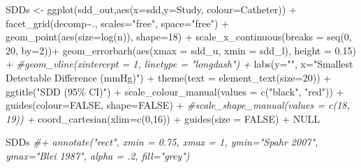 \documentclass[
]{article}
\newenvironment{Shaded}{\begin{snugshade}}{\end{snugshade}}
\newcommand{\AttributeTok}[1]{\textcolor[rgb]{0.77,0.63,0.00}{#1}}
\newcommand{\CommentTok}[1]{\textcolor[rgb]{0.56,0.35,0.01}{\textit{#1}}}
\newcommand{\ConstantTok}[1]{\textcolor[rgb]{0.00,0.00,0.00}{#1}}
\newcommand{\DecValTok}[1]{\textcolor[rgb]{0.00,0.00,0.81}{#1}}
\newcommand{\FloatTok}[1]{\textcolor[rgb]{0.00,0.00,0.81}{#1}}
\newcommand{\FunctionTok}[1]{\textcolor[rgb]{0.00,0.00,0.00}{#1}}
\newcommand{\NormalTok}[1]{#1}
\newcommand{\OtherTok}[1]{\textcolor[rgb]{0.56,0.35,0.01}{#1}}
\newcommand{\SpecialCharTok}[1]{\textcolor[rgb]{0.00,0.00,0.00}{#1}}
\newcommand{\StringTok}[1]{\textcolor[rgb]{0.31,0.60,0.02}{#1}}
\begin{document}
\begin{Shaded}
\begin{Highlighting}[]
\NormalTok{SDDs }\OtherTok{\textless{}{-}} \FunctionTok{ggplot}\NormalTok{(sdd\_out,}\FunctionTok{aes}\NormalTok{(}\AttributeTok{x=}\NormalTok{sdd,}\AttributeTok{y=}\NormalTok{Study, }
                           \AttributeTok{colour=}\NormalTok{Catheter)) }\SpecialCharTok{+}
  \FunctionTok{facet\_grid}\NormalTok{(decomp}\SpecialCharTok{\textasciitilde{}}\NormalTok{., }\AttributeTok{scales=}\StringTok{"free"}\NormalTok{, }\AttributeTok{space=}\StringTok{"free"}\NormalTok{) }\SpecialCharTok{+}
  \FunctionTok{geom\_point}\NormalTok{(}\FunctionTok{aes}\NormalTok{(}\AttributeTok{size=}\FunctionTok{log}\NormalTok{(n)), }\AttributeTok{shape=}\DecValTok{18}\NormalTok{) }\SpecialCharTok{+} 
  \FunctionTok{scale\_x\_continuous}\NormalTok{(}\AttributeTok{breaks =} \FunctionTok{seq}\NormalTok{(}\DecValTok{0}\NormalTok{, }\DecValTok{20}\NormalTok{, }\AttributeTok{by=}\DecValTok{2}\NormalTok{))}\SpecialCharTok{+}
  \FunctionTok{geom\_errorbarh}\NormalTok{(}\FunctionTok{aes}\NormalTok{(}\AttributeTok{xmax =}\NormalTok{ sdd\_u, }\AttributeTok{xmin =}\NormalTok{ sdd\_l), }\AttributeTok{height =} \FloatTok{0.15}\NormalTok{) }\SpecialCharTok{+}
  \CommentTok{\#geom\_vline(xintercept = 1, linetype = "longdash") +}
  \FunctionTok{labs}\NormalTok{(}\AttributeTok{y=}\StringTok{""}\NormalTok{, }\AttributeTok{x=}\StringTok{"Smallest Detectable Difference (mmHg)"}\NormalTok{) }\SpecialCharTok{+}
  \FunctionTok{theme}\NormalTok{(}\AttributeTok{text =} \FunctionTok{element\_text}\NormalTok{(}\AttributeTok{size=}\DecValTok{20}\NormalTok{)) }\SpecialCharTok{+}
  \FunctionTok{ggtitle}\NormalTok{(}\StringTok{"SDD (95\% CI)"}\NormalTok{) }\SpecialCharTok{+}
  \FunctionTok{scale\_colour\_manual}\NormalTok{(}\AttributeTok{values =} \FunctionTok{c}\NormalTok{(}\StringTok{"black"}\NormalTok{, }\StringTok{"red"}\NormalTok{)) }\SpecialCharTok{+}
  \FunctionTok{guides}\NormalTok{(}\AttributeTok{colour=}\ConstantTok{FALSE}\NormalTok{, }\AttributeTok{shape=}\ConstantTok{FALSE}\NormalTok{) }\SpecialCharTok{+}
  \CommentTok{\#scale\_shape\_manual(values = c(18, 19)) +}
  \FunctionTok{coord\_cartesian}\NormalTok{(}\AttributeTok{xlim=}\FunctionTok{c}\NormalTok{(}\DecValTok{0}\NormalTok{,}\DecValTok{16}\NormalTok{)) }\SpecialCharTok{+}
  \FunctionTok{guides}\NormalTok{(}\AttributeTok{size =} \ConstantTok{FALSE}\NormalTok{) }\SpecialCharTok{+}
  \ConstantTok{NULL}

\NormalTok{SDDs  }\CommentTok{\#+ annotate("rect", xmin = 0.75, xmax = 1, ymin="Spahr 2007", ymax="Blei 1987", alpha = .2, fill="grey")}
\end{Highlighting}
\end{Shaded}
\end{document}
